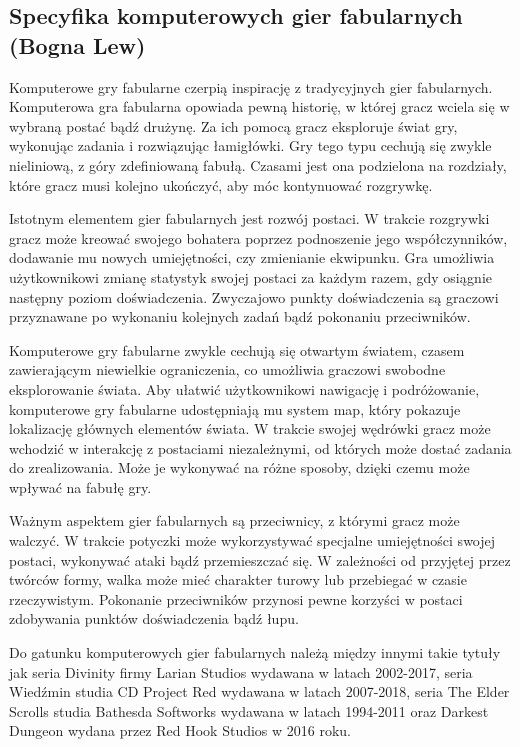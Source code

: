 \subsection{Specyfika komputerowych gier fabularnych (Bogna Lew)}\label{ss:rpg}
Komputerowe gry fabularne czerpią inspirację z tradycyjnych gier fabularnych. Komputerowa
gra fabularna opowiada pewną historię, w której gracz wciela się w wybraną postać bądź drużynę.
Za ich pomocą gracz eksploruje świat gry, wykonując zadania i rozwiązując łamigłówki. Gry tego typu cechują się zwykle
nieliniową, z góry zdefiniowaną fabułą. Czasami jest ona podzielona na rozdziały, które gracz musi kolejno ukończyć, aby
móc kontynuować rozgrywkę.

Istotnym elementem gier fabularnych jest rozwój postaci. W trakcie rozgrywki gracz może kreować swojego bohatera
poprzez podnoszenie jego współczynników, dodawanie mu nowych umiejętności, czy zmienianie ekwipunku. Gra umożliwia
użytkownikowi zmianę statystyk swojej postaci za każdym razem, gdy osiągnie następny poziom doświadczenia. Zwyczajowo
punkty doświadczenia są graczowi przyznawane po wykonaniu kolejnych zadań bądź pokonaniu przeciwników.

Komputerowe gry fabularne zwykle cechują się otwartym światem, czasem zawierającym niewielkie ograniczenia, co umożliwia
graczowi swobodne eksplorowanie świata. Aby ułatwić użytkownikowi nawigację i podróżowanie, komputerowe gry fabularne
udostępniają mu system map, który pokazuje lokalizację głównych elementów świata. W trakcie swojej wędrówki gracz może
wchodzić w interakcję z postaciami niezależnymi, od których może dostać zadania do zrealizowania. Może je wykonywać na
różne sposoby, dzięki czemu może wpływać na fabułę gry.

Ważnym aspektem gier fabularnych są przeciwnicy, z którymi gracz może walczyć. W trakcie potyczki może wykorzystywać
specjalne umiejętności swojej postaci, wykonywać ataki bądź przemieszczać się. W zależności od przyjętej przez twórców
formy, walka może mieć charakter turowy lub przebiegać w czasie rzeczywistym. Pokonanie przeciwników przynosi pewne
korzyści w postaci zdobywania punktów doświadczenia bądź łupu.

Do gatunku komputerowych gier fabularnych należą między innymi takie tytuły jak seria Divinity firmy Larian Studios
wydawana w latach 2002-2017, seria Wiedźmin studia CD Project Red wydawana w latach 2007-2018, seria The Elder Scrolls
studia Bathesda Softworks wydawana w latach 1994-2011 oraz Darkest Dungeon wydana przez Red Hook Studios w 2016 roku.
